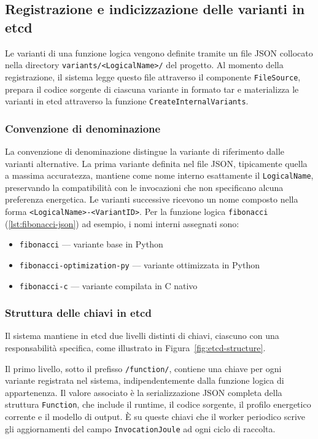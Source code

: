 \subsection{Registrazione e indicizzazione delle varianti in etcd}
\label{sec:variant-registration}

Le varianti di una funzione logica vengono definite tramite un file 
JSON collocato nella directory \texttt{variants/<LogicalName>/} del 
progetto. Al momento della registrazione, il sistema legge questo file 
attraverso il componente \texttt{FileSource}, prepara il codice 
sorgente di ciascuna variante in formato tar e materializza le varianti 
in etcd attraverso la funzione \texttt{CreateInternalVariants}.

\subsubsection{Convenzione di denominazione}

La convenzione di denominazione distingue la variante di riferimento 
dalle varianti alternative. La prima variante definita nel file JSON, tipicamente quella a massima accuratezza, mantiene come nome interno 
esattamente il \texttt{LogicalName}, preservando la compatibilità con 
le invocazioni che non specificano alcuna preferenza energetica. Le 
varianti successive ricevono un nome composto nella forma 
\texttt{<LogicalName>-<VariantID>}. Per la funzione logica 
\texttt{fibonacci} (\autoref{lst:fibonacci-json}) ad esempio, i nomi interni assegnati sono:

\begin{itemize}
    \item \texttt{fibonacci} — variante base in Python
    \item \texttt{fibonacci-optimization-py} — variante ottimizzata 
    in Python
    \item \texttt{fibonacci-c} — variante compilata in C nativo
\end{itemize}

\subsubsection{Struttura delle chiavi in etcd}

Il sistema mantiene in etcd due livelli distinti di chiavi, ciascuno 
con una responsabilità specifica, come illustrato in 
Figura~\ref{fig:etcd-structure}.

Il primo livello, sotto il prefisso \texttt{/function/}, contiene una 
chiave per ogni variante registrata nel sistema, indipendentemente 
dalla funzione logica di appartenenza. Il valore associato è la 
serializzazione JSON completa della struttura \texttt{Function}, che 
include il runtime, il codice sorgente, il profilo energetico corrente 
e il modello di output. È su queste chiavi che il worker periodico 
scrive gli aggiornamenti del campo \texttt{InvocationJoule} ad ogni 
ciclo di raccolta.

